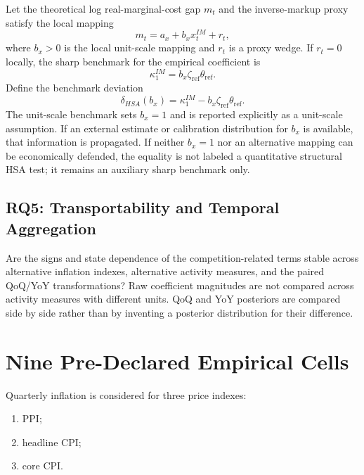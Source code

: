 \documentclass[11pt]{article}
\begin{document}
Let the theoretical log real-marginal-cost gap \(m_t\) and the inverse-markup proxy satisfy the local mapping
\begin{equation}
m_t=a_x+b_x x_t^{IM}+r_t,
\label{eq:mc_proxy_mapping}
\end{equation}
where \(b_x>0\) is the local unit-scale mapping and \(r_t\) is a proxy wedge. If \(r_t=0\) locally, the sharp benchmark for the empirical coefficient is
\begin{equation}
\boxed{
\kappa_1^{IM}=b_x\zeta_{\mathrm{ref}}\theta_{\mathrm{ref}}.
}
\label{eq:local_hsa_restriction}
\end{equation}
Define the benchmark deviation
\begin{equation}
\boxed{
\delta_{HSA}(b_x)
=
\kappa_1^{IM}-b_x\zeta_{\mathrm{ref}}\theta_{\mathrm{ref}}.
}
\label{eq:delta_hsa}
\end{equation}
The unit-scale benchmark sets \(b_x=1\) and is reported explicitly as a unit-scale assumption. If an external estimate or calibration distribution for \(b_x\) is available, that information is propagated. If neither \(b_x=1\) nor an alternative mapping can be economically defended, the equality is not labeled a quantitative structural HSA test; it remains an auxiliary sharp benchmark only.

\subsection{RQ5: Transportability and Temporal Aggregation}

Are the signs and state dependence of the competition-related terms stable across alternative inflation indexes, alternative activity measures, and the paired QoQ/YoY transformations? Raw coefficient magnitudes are not compared across activity measures with different units. QoQ and YoY posteriors are compared side by side rather than by inventing a posterior distribution for their difference.

\section{Nine Pre-Declared Empirical Cells}

Quarterly inflation is considered for three price indexes:
\begin{enumerate}
\item PPI;
\item headline CPI;
\item core CPI.
\end{enumerate}
\end{document}
